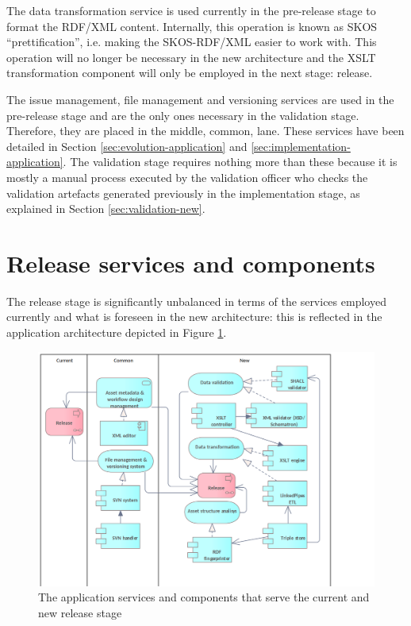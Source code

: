	The data transformation service is used currently in the pre-release stage to format the RDF/XML content. Internally, this operation is known as SKOS ``prettification'', i.e. making the SKOS-RDF/XML easier to work with. This operation will no longer be necessary in the new architecture and the XSLT transformation component will only be employed in the next stage: release.
	
	The issue management, file management and versioning services are used in the pre-release stage and are the only ones necessary in the validation stage. Therefore, they are placed in the middle, common, lane. These services have been detailed in Section \ref{sec:evolution-application} and \ref{sec:implementation-application}. The validation stage requires nothing more than these because it is mostly a manual process executed by the validation officer who checks the validation artefacts generated previously in the implementation stage, as explained in Section \ref{sec:validation-new}.	

	\section{Release services and components}
	\label{sec:release-application}	
	
	The release stage is significantly unbalanced in terms of the services employed currently and what is foreseen in the new architecture: this is reflected in the application architecture depicted in Figure \ref{fig:application-release}. 
	
	\begin{figure}[h]
		\centering
		\includegraphics[width=.9\textwidth]{images/application/Release v3.png}
		\caption{The application services and components that serve the current and new release stage}
		\label{fig:application-release}
	\end{figure}

